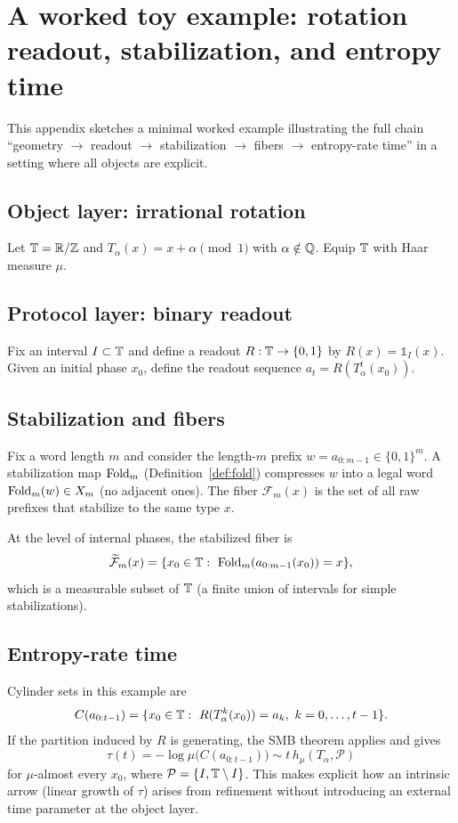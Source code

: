 \section{A worked toy example: rotation readout, stabilization, and entropy time}\label{sec:appendix:toy}

This appendix sketches a minimal worked example illustrating the full chain ``geometry $\rightarrow$ readout $\rightarrow$ stabilization $\rightarrow$ fibers $\rightarrow$ entropy-rate time'' in a setting where all objects are explicit.

\subsection{Object layer: irrational rotation}
Let $\mathbb{T}=\mathbb{R}/\mathbb{Z}$ and $T_\alpha(x)=x+\alpha \pmod{1}$ with $\alpha\notin\mathbb{Q}$. Equip $\mathbb{T}$ with Haar measure $\mu$.

\subsection{Protocol layer: binary readout}
Fix an interval $I\subset\mathbb{T}$ and define a readout $R:\mathbb{T}\to\{0,1\}$ by $R(x)=\mathds{1}_I(x)$. Given an initial phase $x_0$, define the readout sequence $a_t=R(T_\alpha^t(x_0))$.

\subsection{Stabilization and fibers}
Fix a word length $m$ and consider the length-$m$ prefix $w=a_{0:m-1}\in\{0,1\}^m$. A stabilization map $\mathrm{Fold}_m$ (Definition~\ref{def:fold}) compresses $w$ into a legal word $\mathrm{Fold}_m(w)\in X_m$ (no adjacent ones). The fiber $\mathcal{F}_m(x)$ is the set of all raw prefixes that stabilize to the same type $x$.

At the level of internal phases, the stabilized fiber is
\[
\widetilde{\mathcal{F}}_m(x)=\{x_0\in\TT:\ \Fold_m(a_{0:m-1}(x_0))=x\},
\]
which is a measurable subset of $\mathbb{T}$ (a finite union of intervals for simple stabilizations).

\subsection{Entropy-rate time}
Cylinder sets in this example are
\[
C(a_{0:t-1})=\{x_0\in\TT:\ R(T_\alpha^k(x_0))=a_k,\ k=0,\dots,t-1\}.
\]
If the partition induced by $R$ is generating, the SMB theorem applies and gives
\[
\tau(t)=-\log\mu\bigl(C(a_{0:t-1})\bigr)\sim t\,h_\mu(T_\alpha,\mathcal{P})
\]
for $\mu$-almost every $x_0$, where $\mathcal{P}=\{I,\mathbb{T}\setminus I\}$. This makes explicit how an intrinsic arrow (linear growth of $\tau$) arises from refinement without introducing an external time parameter at the object layer.

